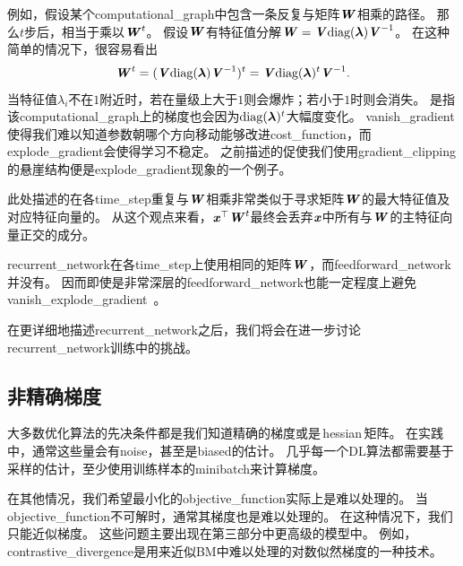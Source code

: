 
例如，假设某个\gls{computational_graph}中包含一条反复与矩阵$\boldsymbol{\mathit{W}}$相乘的路径。
那么$t$步后，相当于乘以$\boldsymbol{\mathit{W}}^t$。
假设$\boldsymbol{\mathit{W}}$有特征值分解$\boldsymbol{\mathit{W}} = \boldsymbol{\mathit{V}} \text{diag}(\boldsymbol{\lambda}) \boldsymbol{\mathit{V}}^{-1}$。
在这种简单的情况下，很容易看出
\begin{equation}
  \boldsymbol{\mathit{W}}^t = (\boldsymbol{\mathit{V}} \text{diag}(\boldsymbol{\lambda}) \boldsymbol{\mathit{V}}^{-1})^t = \boldsymbol{\mathit{V}}\text{diag}(\boldsymbol{\lambda})^t  \boldsymbol{\mathit{V}}^{-1}.
\end{equation}
当特征值$\lambda_i$不在$1$附近时，若在量级上大于$1$则会爆炸；若小于$1$时则会消失。
是指该\gls{computational_graph}上的梯度也会因为$\text{diag}(\boldsymbol{\lambda})^t$大幅度变化。
\gls{vanish_gradient}使得我们难以知道参数朝哪个方向移动能够改进\gls{cost_function}，而\gls{explode_gradient}会使得学习不稳定。
之前描述的促使我们使用\gls{gradient_clipping}的悬崖结构便是\gls{explode_gradient}现象的一个例子。


此处描述的在各\gls{time_step}重复与$\boldsymbol{\mathit{W}}$相乘非常类似于寻求矩阵$\boldsymbol{\mathit{W}}$的最大特征值及对应特征向量的。
从这个观点来看，$\boldsymbol{\mathit{x}}^\top\boldsymbol{\mathit{W}}^t$最终会丢弃$\boldsymbol{\mathit{x}}$中所有与$\boldsymbol{\mathit{W}}$的主特征向量正交的成分。


\gls{recurrent_network}在各\gls{time_step}上使用相同的矩阵$\boldsymbol{\mathit{W}}$，而\gls{feedforward_network}并没有。
因而即使是非常深层的\gls{feedforward_network}也能一定程度上避免\gls{vanish_explode_gradient}~\citep{Sussillo14}。


在更详细地描述\gls{recurrent_network}之后，我们将会在进一步讨论\gls{recurrent_network}训练中的挑战。


\subsection{非精确梯度}
\label{sec:inexact_gradients}
大多数优化算法的先决条件都是我们知道精确的梯度或是\,\gls{hessian}\,矩阵。
在实践中，通常这些量会有\gls{noise}，甚至是\gls{biased}的估计。
几乎每一个\gls{DL}算法都需要基于采样的估计，至少使用训练样本的\gls{minibatch}来计算梯度。


在其他情况，我们希望最小化的\gls{objective_function}实际上是难以处理的。
当\gls{objective_function}不可解时，通常其梯度也是难以处理的。
在这种情况下，我们只能近似梯度。
这些问题主要出现在第三部分中更高级的模型中。
例如，\gls{contrastive_divergence}是用来近似\gls{BM}中难以处理的对数似然梯度的一种技术。

